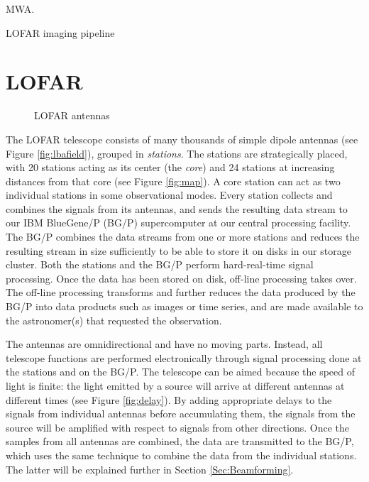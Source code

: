 \documentclass{llncs}
\begin{document}
MWA.

LOFAR imaging pipeline \cite{Romein:10a}

\section{LOFAR}
\label{Sec:LOFAR}

\begin{figure}[ht]
\hfill
{}
\hfill
{}
\caption{LOFAR antennas}
\end{figure}

The LOFAR telescope consists of many thousands of simple dipole antennas (see Figure \ref{fig:lbafield}), grouped in \emph{stations}. The stations are strategically placed, with 20 stations acting as its center (the \emph{core}) and 24 stations at increasing distances from that core (see Figure \ref{fig:map}). A core station can act as two individual stations in some observational modes. Every station collects and combines the signals from its antennas, and sends the resulting data stream to our IBM BlueGene/P (BG/P) supercomputer at our central processing facility. The BG/P combines the data streams from one or more stations and reduces the resulting stream in size sufficiently to be able to store it on disks in our storage cluster. Both the stations and the BG/P perform hard-real-time signal processing. Once the data has been stored on disk, off-line processing takes over. The off-line processing transforms and further reduces the data produced by the BG/P into data products such as images or time series, and are made available to the astronomer(s) that requested the observation.

The antennas are omnidirectional and have no moving parts. Instead, all telescope functions are performed electronically through signal processing done at the stations and on the BG/P. The telescope can be aimed because the speed of light is finite: the light emitted by a source will arrive at different antennas at different times (see Figure \ref{fig:delay}). By adding appropriate delays to the signals from individual antennas before accumulating them, the signals from the source will be amplified with respect to signals from other directions. Once the samples from all antennas are combined, the data are transmitted to the BG/P, which uses the same technique to combine the data from the individual stations. The latter will be explained further in Section \ref{Sec:Beamforming}.
\end{document}
